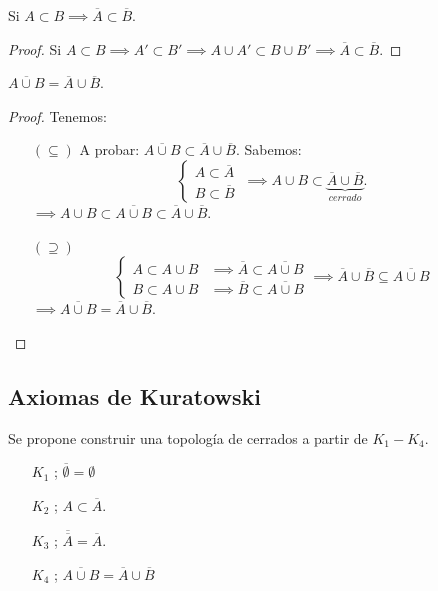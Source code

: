 \begin{prop}
	Si $A\subset B\implies \overline{A}\subset \overline{B}$. 
	\begin{proof}
		Si $A\subset B\implies A'\subset B'\implies A\cup A'\subset B\cup B'\implies \overline{A}\subset \overline{B}$. 
	\end{proof}
\end{prop}

\begin{prop}
	$\overline{A\cup B}=\overline{A}\cup \overline{B}$. 
	\begin{proof}
		Tenemos:
		\begin{enumerate}
			\item[$(\subseteq)$] A probar: $\overline{A\cup B}\subset \overline{A}\cup \overline{B}$. Sabemos: 
			$$\begin{cases}
				A\subset \overline{A}\\ B\subset \overline{B}\
			\end{cases}\implies A\cup B\subset \underbrace{\overline{A}\cup \overline{B}}_{cerrado}.$$
		$\implies A\cup B\subset \overline{A\cup B}\subset \overline{A}\cup \overline{B}$. 
		\item[$(\supseteq)$] 
		$$\begin{cases}
			A\subset A\cup B &\implies \overline{A}\subset \overline{A\cup B}\\
		B\subset A\cup B &\implies \overline{B}\subset \overline{A\cup B}		\end{cases}\implies \overline{A}\cup \overline{B}\subseteq \overline{A\cup B}$$
	$\implies \overline{A\cup B}=\overline{A}\cup \overline{B}$. 
		\end{enumerate}
	\end{proof}
\end{prop}

\subsection{Axiomas de Kuratowski}

Se propone construir una topología de cerrados a partir de $K_1-K_4$. 

\begin{enumerate}
	\item[$K_1$]; $\overline{\emptyset}=\emptyset$
	\item[$K_2$]; $A\subset \overline{A}$.
	\item[$K_3$]; $\overline{\overline{A}} =\overline{A}$. 
	\item[$K_4$]; $\overline{A\cup B}=\overline{A}\cup \overline{B}$
\end{enumerate}

